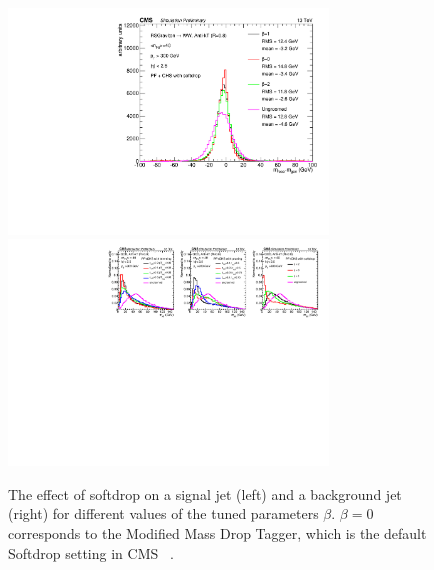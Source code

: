 \begin{figure}[h!] 
    \centering 
    \includegraphics[height=6cm]{figures/event_reconstruction/sig_sd.pdf}
    \includegraphics[height=6cm]{figures/event_reconstruction/bkg_softdrop-noData.pdf}
     \caption{The effect of softdrop on a signal jet (left) and a background jet (right) for different values of the tuned parameters $\beta$. $\beta=0$ corresponds to the Modified Mass Drop Tagger, which is the default Softdrop setting in CMS ~\cite{CMS-PAS-JME-14-001}.}
     \label{fig:objreco:softdrop}
 \end{figure}

